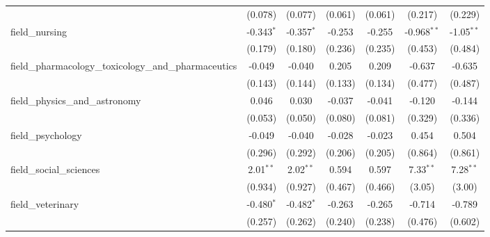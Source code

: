 \begin{tabular}{lcccccc}
                                                               & (0.078)       & (0.077)        & (0.061)       & (0.061)        & (0.217)       & (0.229)\\   
   field\_nursing                                              & -0.343$^{*}$  & -0.357$^{*}$   & -0.253        & -0.255         & -0.968$^{**}$ & -1.05$^{**}$\\   
                                                               & (0.179)       & (0.180)        & (0.236)       & (0.235)        & (0.453)       & (0.484)\\   
   field\_pharmacology\_toxicology\_and\_pharmaceutics         & -0.049        & -0.040         & 0.205         & 0.209          & -0.637        & -0.635\\   
                                                               & (0.143)       & (0.144)        & (0.133)       & (0.134)        & (0.477)       & (0.487)\\   
   field\_physics\_and\_astronomy                              & 0.046         & 0.030          & -0.037        & -0.041         & -0.120        & -0.144\\   
                                                               & (0.053)       & (0.050)        & (0.080)       & (0.081)        & (0.329)       & (0.336)\\   
   field\_psychology                                           & -0.049        & -0.040         & -0.028        & -0.023         & 0.454         & 0.504\\   
                                                               & (0.296)       & (0.292)        & (0.206)       & (0.205)        & (0.864)       & (0.861)\\   
   field\_social\_sciences                                     & 2.01$^{**}$   & 2.02$^{**}$    & 0.594         & 0.597          & 7.33$^{**}$   & 7.28$^{**}$\\   
                                                               & (0.934)       & (0.927)        & (0.467)       & (0.466)        & (3.05)        & (3.00)\\   
   field\_veterinary                                           & -0.480$^{*}$  & -0.482$^{*}$   & -0.263        & -0.265         & -0.714        & -0.789\\   
                                                               & (0.257)       & (0.262)        & (0.240)       & (0.238)        & (0.476)       & (0.602)\\   

\end{tabular}
